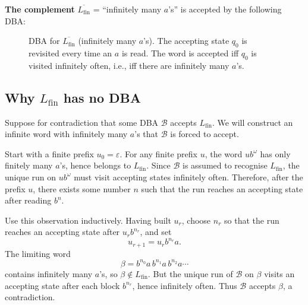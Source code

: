 \medskip\noindent
\textbf{The complement} $\overline{L_{\mathrm{fin}}}$ = ``infinitely many
$a$'s'' is accepted by the following DBA:

\begin{figure}[ht]
  \centering
  \caption{DBA for $\overline{L_{\mathrm{fin}}}$ (infinitely many $a$'s).
           The accepting state $q_0$ is revisited every time an $a$ is read.
           The word is accepted iff $q_0$ is visited infinitely often,
           i.e., iff there are infinitely many $a$'s.}
  \label{fig:dba-infmany}
\end{figure}

\subsection{Why \texorpdfstring{$L_{\mathrm{fin}}$}{Lfin} has no DBA}

Suppose for contradiction that some DBA $\mathcal{B}$ accepts $L_{\mathrm{fin}}$.
We will construct an infinite word with infinitely many $a$'s that
$\mathcal{B}$ is forced to accept.

Start with a finite prefix $u_0=\varepsilon$.  For any finite prefix $u$,
the word $u b^\omega$ has only finitely many $a$'s, hence belongs to
$L_{\mathrm{fin}}$.  Since $\mathcal{B}$ is assumed to recognise
$L_{\mathrm{fin}}$, the unique run on $u b^\omega$ must visit accepting
states infinitely often.  Therefore, after the prefix $u$, there exists
some number $n$ such that the run reaches an accepting state after reading
$b^n$.

Use this observation inductively.  Having built $u_r$, choose $n_r$ so that
the run reaches an accepting state after $u_r b^{n_r}$, and set
\[
  u_{r+1} = u_r b^{n_r} a.
\]
The limiting word
\[
  \beta = b^{n_0} a\, b^{n_1} a\, b^{n_2} a \cdots
\]
contains infinitely many $a$'s, so $\beta \notin L_{\mathrm{fin}}$.  But the
unique run of $\mathcal{B}$ on $\beta$ visits an accepting state after each
block $b^{n_r}$, hence infinitely often.  Thus $\mathcal{B}$ accepts
$\beta$, a contradiction.

